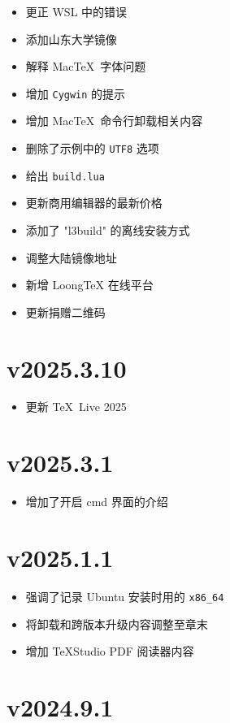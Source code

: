 \begin{itemize}
  \item 更正 WSL 中的错误
  \item 添加山东大学镜像
  \item 解释 Mac\TeX\ 字体问题
  \item 增加 \texttt{Cygwin} 的提示
  \item 增加 Mac\TeX\ 命令行卸载相关内容
  \item 删除了示例中的 \texttt{UTF8} 选项
  \item 给出 \texttt{build.lua}
  \item 更新商用编辑器的最新价格
  \item 添加了 "l3build" 的离线安装方式
  \item 调整大陆镜像地址
  \item 新增 LoongTeX 在线平台
  \item 更新捐赠二维码
\end{itemize}

\section*{v2025.3.10}

\begin{itemize}
  \item 更新 \TeX~Live 2025
\end{itemize}

\section*{v2025.3.1}

\begin{itemize}
  \item 增加了开启 \textsf{cmd} 界面的介绍
\end{itemize}

\section*{v2025.1.1}

\begin{itemize}
  \item 强调了记录 Ubuntu 安装时用的 \texttt{x86\_64}
  \item 将卸载和跨版本升级内容调整至章末
  \item 增加 \TeX Studio PDF 阅读器内容
\end{itemize}

\section*{v2024.9.1}

